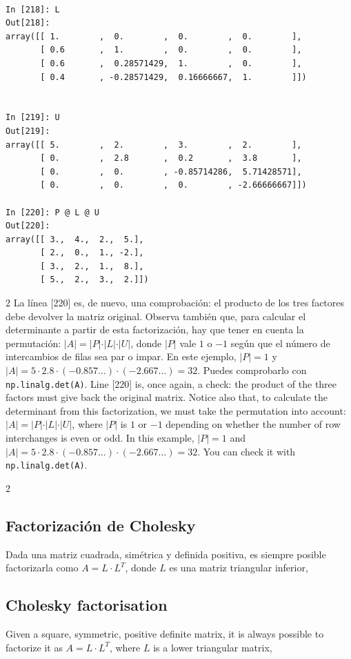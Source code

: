 \begin{center}
\begin{minipage}{0.7\textwidth}
\begin{verbatim}

In [218]: L
Out[218]: 
array([[ 1.        ,  0.        ,  0.        ,  0.        ],
       [ 0.6       ,  1.        ,  0.        ,  0.        ],
       [ 0.6       ,  0.28571429,  1.        ,  0.        ],
       [ 0.4       , -0.28571429,  0.16666667,  1.        ]])


In [219]: U
Out[219]: 
array([[ 5.        ,  2.        ,  3.        ,  2.        ],
       [ 0.        ,  2.8       ,  0.2       ,  3.8       ],
       [ 0.        ,  0.        , -0.85714286,  5.71428571],
       [ 0.        ,  0.        ,  0.        , -2.66666667]])

In [220]: P @ L @ U
Out[220]: 
array([[ 3.,  4.,  2.,  5.],
       [ 2.,  0.,  1., -2.],
       [ 3.,  2.,  1.,  8.],
       [ 5.,  2.,  3.,  2.]])
\end{verbatim}
\end{minipage}
\end{center}
\begin{paracol}{2}
La línea [220] es, de nuevo, una comprobación: el producto de los tres factores debe devolver la matriz original. Observa también que, para calcular el determinante a partir de esta factorización, hay que tener en cuenta la permutación: $\vert A \vert = \vert P \vert \cdot \vert L \vert \cdot \vert U \vert$, donde $\vert P \vert$ vale $1$ o $-1$ según que el número de intercambios de filas sea par o impar. En este ejemplo, $\vert P \vert =1$ y $\vert A \vert = 5\cdot 2.8 \cdot (-0.857\ldots) \cdot (-2.667\ldots)=32$. Puedes comprobarlo con \texttt{np.linalg.det(A)}.
\switchcolumn
Line [220] is, once again, a check: the product of the three factors must give back the original matrix. Notice also that, to calculate the determinant from this factorization, we must take the permutation into account: $\vert A \vert = \vert P \vert \cdot \vert L \vert \cdot \vert U \vert$, where $\vert P \vert$ is $1$ or $-1$ depending on whether the number of row interchanges is even or odd. In this example, $\vert P \vert =1$ and $\vert A \vert = 5\cdot 2.8 \cdot (-0.857\ldots) \cdot (-2.667\ldots)=32$. You can check it with \texttt{np.linalg.det(A)}.
\end{paracol}

\begin{paracol}{2}
\subsection{Factorización de Cholesky}\label{chol}
Dada una matriz cuadrada, simétrica y definida positiva, es siempre posible factorizarla como $A=L\cdot L^T$, donde $L$ es una matriz triangular inferior,
\switchcolumn
\subsection{Cholesky factorisation}
Given a square, symmetric, positive definite matrix, it is always possible to factorize it as $A=L\cdot L^T$, where $L$ is a lower triangular matrix,
\end{paracol}

